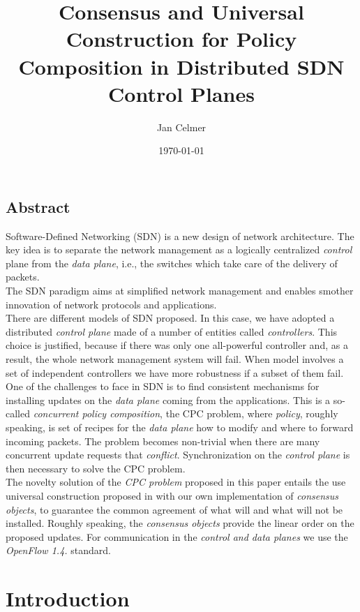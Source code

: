 \documentclass{article}
\title{Consensus and Universal Construction for Policy Composition in Distributed SDN Control Planes}
\author{Jan Celmer}
\date{\today}
\theoremstyle{remark}
\begin{document}
\maketitle

\subsection*{Abstract} Software-Defined Networking (SDN) is a new design of network architecture. The key idea is to separate the network management as a logically centralized \emph{control} plane from the \emph{data plane}, i.e., the switches which take care of the delivery of packets.    \\
The SDN paradigm aims at simplified network management and enables smother innovation of network protocols and applications.\\
There are different models of SDN proposed. In this case, we have adopted a distributed \emph{control plane} made of a number of entities called \emph{controllers}. This choice is justified, because if there was only one all-powerful controller and, as a result, the whole network management system will fail. When model involves a set of independent controllers we have more robustness if a subset of them fail.
\\
One of the challenges to face in SDN is to find consistent mechanisms for installing updates on the \emph{data plane} coming from the applications. This is a so-called \emph{concurrent policy composition}, the CPC problem, where \emph{policy}, roughly speaking, is set of recipes for the \emph{data plane} how to modify and where to forward incoming packets. The problem becomes non-trivial when there are many concurrent update requests that \emph{conflict}. Synchronization on the \emph{control plane} is then necessary to solve the CPC problem. 
\\
 The novelty solution of the \emph{CPC problem} proposed in this paper entails the use universal construction proposed in \cite{Herlihy:2008:AMP:1734069} with our own implementation of \emph{consensus objects}, to guarantee the common agreement of what will and what will not be installed. Roughly speaking, the \emph{consensus objects} provide the linear order on the proposed updates. For communication in the \emph{control and data planes} we use the \emph{OpenFlow 1.4.} standard.
\newpage
\tableofcontents
\section{Introduction}
\end{document}
